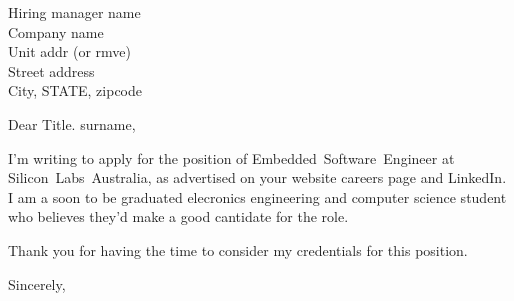 \documentclass[
    backaddress=false,
    foldmarks=false,
    fromalign=right,
    fromrule,
    fromphone,
    fromemail,
    parskip=half,
    refline=nodate
]{scrlttr2}
\begin{document}
    


    \renewcommand*\raggedsignature{\raggedright}

    \begin{letter}{{\color{red}%
        Hiring manager name \\
        Company name        \\
        Unit addr (or rmve) \\
        Street address      \\
        City, STATE, zipcode}}

        \opening{Dear {\color{red}Title. surname},}

        I'm writing to apply for the position of Embedded~Software~Engineer at Silicon~Labs~Australia, as advertised on your website careers page and LinkedIn. I am a soon to be graduated elecronics engineering and computer science student who believes they'd make a good cantidate for the role.

        Thank you for having the time to consider my credentials for this position.

        \closing{Sincerely,}
    \end{letter}
\end{document}
